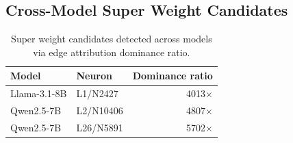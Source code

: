 \documentclass[11pt]{article}
\begin{document}
\subsection{Cross-Model Super Weight Candidates}

\begin{table}[htbp]
\centering
\caption{Super weight candidates detected across models via edge attribution dominance ratio.}
\label{tab:superweights}
\small
\begin{tabular}{llr}
\toprule
\textbf{Model} & \textbf{Neuron} & \textbf{Dominance ratio} \\
\midrule
Llama-3.1-8B & L1/N2427  & 4013$\times$ \\
Qwen2.5-7B   & L2/N10406 & 4807$\times$ \\
Qwen2.5-7B   & L26/N5891 & 5702$\times$ \\
\bottomrule
\end{tabular}
\end{table}
\end{document}
